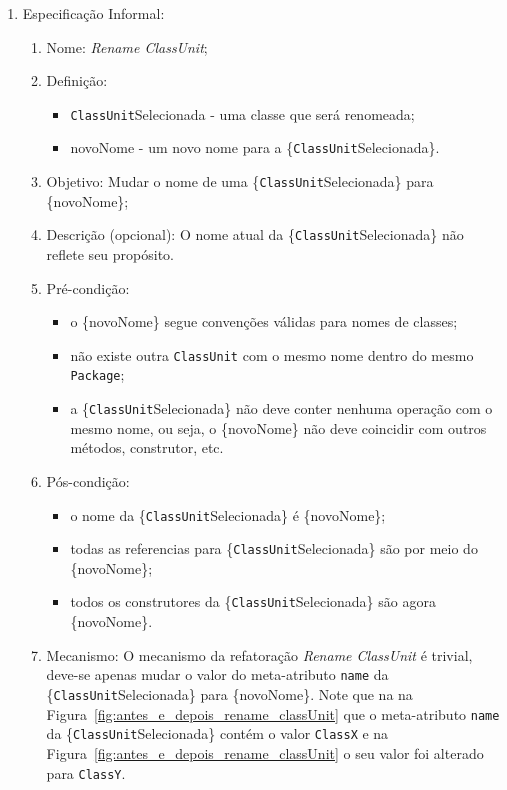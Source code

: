 \begin{enumerate}
	\item Especificação Informal:
		\begin{enumerate}
			\item Nome: \textit{Rename ClassUnit};
			\item Definição:
			    \begin{itemize}
			        \item \texttt{ClassUnit}Selecionada - uma classe que será renomeada;
			        \item novoNome - um novo nome para a \{\texttt{ClassUnit}Selecionada\}.
			    \end{itemize}
			\item Objetivo: Mudar o nome de uma \{\texttt{ClassUnit}Selecionada\} para \{novoNome\};
			\item Descrição (opcional): O nome atual da \{\texttt{ClassUnit}Selecionada\} não reflete seu propósito.
			\item Pré-condição:
			    \begin{itemize}
			        \item o \{novoNome\} segue convenções válidas para nomes de classes;
			        \item não existe outra \texttt{ClassUnit} com o mesmo nome dentro do mesmo \texttt{Package};
			        \item a \{\texttt{ClassUnit}Selecionada\} não deve conter nenhuma operação com o mesmo nome, ou seja, o \{novoNome\} não deve coincidir com outros métodos, construtor, etc. 
			    \end{itemize}
			\item Pós-condição:
			    \begin{itemize}
			        \item o nome da \{\texttt{ClassUnit}Selecionada\} é \{novoNome\};
			        \item todas as referencias para \{\texttt{ClassUnit}Selecionada\} são por meio do \{novoNome\};
			        \item todos os construtores da \{\texttt{ClassUnit}Selecionada\} são agora \{novoNome\}.
			    \end{itemize}
			\item Mecanismo: O mecanismo da refatoração \textit{Rename ClassUnit} é trivial, deve-se apenas mudar o valor do meta-atributo \texttt{name} da \{\texttt{ClassUnit}Selecionada\} para \{novoNome\}. Note que na na Figura~\ref{fig:antes_e_depois_rename_classUnit}  que o meta-atributo \texttt{name} da \{\texttt{ClassUnit}Selecionada\} contém o valor \texttt{ClassX} e na  Figura~\ref{fig:antes_e_depois_rename_classUnit}  o seu valor foi alterado para \texttt{ClassY}.

\end{enumerate}
\end{enumerate}
